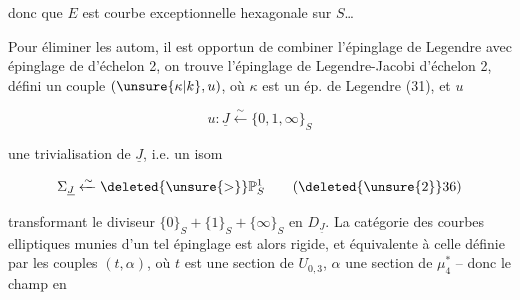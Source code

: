 donc que $E$ est   courbe  exceptionnelle hexagonale sur $S$\ldots

Pour éliminer les autom, il est opportun de combiner l'épinglage de Legendre avec épinglage de   d'échelon 2, on trouve l'épinglage de Legendre-Jacobi d'échelon 2, défini  un couple $(\unsure{\kappa|k},u)$, où $\kappa$ est un ép. de Legendre (31), et  $u$

\[
u:\underline J\xleftarrow{\sim}\{0,1,\infty\}_S
\tag*{(35)}
\]

une trivialisation de $\underline J$, i.e. un isom

\[
\Sigma_{\underline J}\xleftarrow{\sim}\deleted{\unsure{>}}\mathbb P^1_S
\tag*{(\deleted{\unsure{2}}36)}
\]

transformant le diviseur $\{0\}_S+\{1\}_S+\{\infty\}_S$ en $D_{\underline J}$. La catégorie  des courbes elliptiques munies d'un tel épinglage est alors rigide, et équivalente à celle définie par les couples $(t,\alpha)$, où $t$ est une section de $U_{0,3}$, $\alpha$ une section de $\mu_4^*$ -- donc le  champ en
